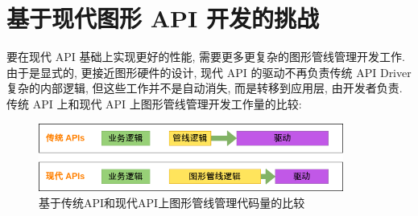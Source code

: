 \documentclass[UTF8]{ctexart}
\begin{document}
\section{基于现代图形 API 开发的挑战\cite{modernGraphicsAPI}}
要在现代 API 基础上实现更好的性能, 需要更多更复杂的图形管线管理开发工作. 由于是显式的, 更接近图形硬件的设计, 现代 API 的驱动不再负责传统 API Driver 复杂的内部逻辑, 但这些工作并不是自动消失, 而是转移到应用层, 由开发者负责. 传统 API 上和现代 API 上图形管线管理开发工作量的比较:
\begin{figure}[H]
  \includegraphics[width=10cm]{graphics_works.png}
  \centering
  \caption{基于传统API和现代API上图形管线管理代码量的比较}
  \label{fig:works_comparation}
\end{figure}
\end{document}
